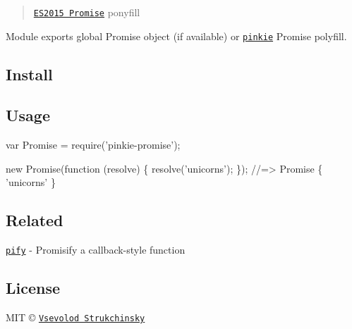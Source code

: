 \begin{quote}
\href{https://people.mozilla.org/~jorendorff/es6-draft.html#sec-promise-objects}{\tt E\+S2015 Promise} ponyfill \end{quote}


Module exports global Promise object (if available) or \href{http://github.com/floatdrop/pinkie}{\tt {\ttfamily pinkie}} Promise polyfill.

\subsection*{Install}




\subsection*{Usage}


\begin{DoxyCode}
var Promise = require('pinkie-promise');

new Promise(function (resolve) \{ resolve('unicorns'); \});
//=> Promise \{ 'unicorns' \}
\end{DoxyCode}


\subsection*{Related}


\begin{DoxyItemize}
\item \href{https://github.com/sindresorhus/pify}{\tt pify} -\/ Promisify a callback-\/style function
\end{DoxyItemize}

\subsection*{License}

M\+IT © \href{http://github.com/floatdrop}{\tt Vsevolod Strukchinsky} 